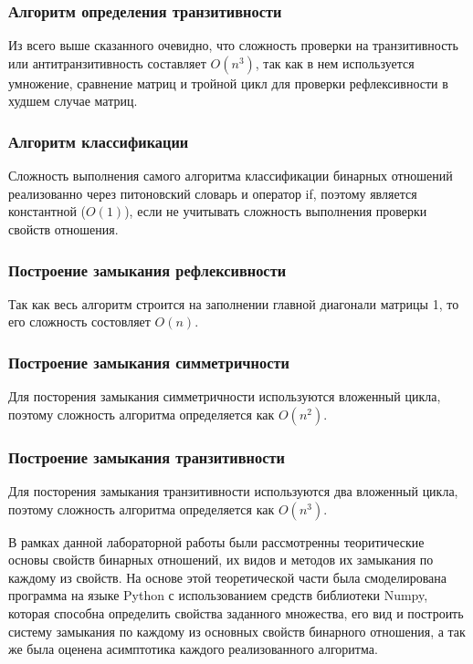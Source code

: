 \documentclass[spec, och, labwork]{shiza}
\begin{document}
        \subsubsection{Алгоритм определения транзитивности}

            Из всего выше сказанного очевидно, что сложность проверки на транзитивность или антитранзитивность составляет $O(n^3)$,
            так как в нем используется умножение, сравнение матриц и тройной цикл для проверки рефлексивности в худшем случае матриц.

        \subsubsection{Алгоритм классификации}
            Сложность выполнения самого алгоритма классификации бинарных отношений реализованно через питоновский словарь 
            и оператор if, поэтому является константной ($O(1)$), если не учитывать сложность выполнения проверки свойств отношения.

        \subsubsection{Построение замыкания рефлексивности}
        
            Так как весь алгоритм строится на заполнении главной диагонали матрицы 1, то его сложность состовляет $O(n)$.

        \subsubsection{Построение замыкания симметричности}

            Для посторения замыкания симметричности используются вложенный цикла, поэтому сложность алгоритма
            определяется как $O(n^2)$.

        \subsubsection{Построение замыкания транзитивности}

            Для посторения замыкания транзитивности используются два вложенный цикла, поэтому сложность алгоритма
            определяется как $O(n^3)$.
    
\conclusion

В рамках данной лабораторной работы были рассмотренны теоритические основы свойств бинарных отношений, их видов и методов
их замыкания по каждому из свойств. На основе этой теоретической части была смоделирована программа на языке Python с 
использованием средств библиотеки Numpy, которая способна определить свойства заданного множества, его вид и построить 
систему замыкания по каждому из основных свойств бинарного отношения, а так же была оценена асимптотика каждого реализованного
алгоритма.
\end{document}
